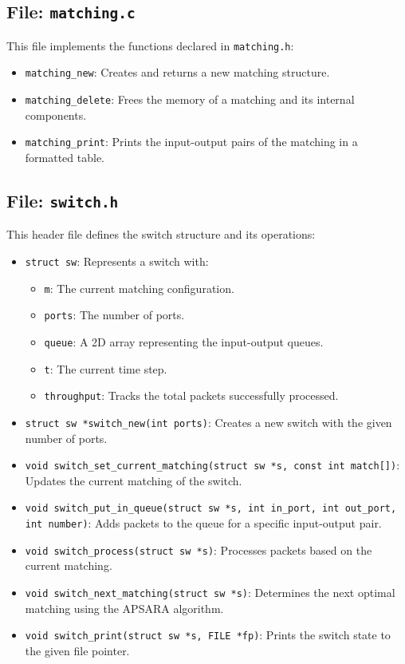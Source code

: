 \documentclass[12pt	]{article}
\begin{document}
\subsection{File: \texttt{matching.c}}
This file implements the functions declared in \texttt{matching.h}:
\begin{itemize}
	\item \texttt{matching\_new}: Creates and returns a new matching structure.
	\item \texttt{matching\_delete}: Frees the memory of a matching and its internal components.
	\item \texttt{matching\_print}: Prints the input-output pairs of the matching in a formatted table.
\end{itemize}

\subsection{File: \texttt{switch.h}}
This header file defines the switch structure and its operations:
\begin{itemize}
	\item \texttt{struct sw}: Represents a switch with:
	\begin{itemize}
		\item \texttt{m}: The current matching configuration.
		\item \texttt{ports}: The number of ports.
		\item \texttt{queue}: A 2D array representing the input-output queues.
		\item \texttt{t}: The current time step.
		\item \texttt{throughput}: Tracks the total packets successfully processed.
	\end{itemize}
	\item \texttt{struct sw *switch\_new(int ports)}: Creates a new switch with the given number of ports.
	\item \texttt{void switch\_set\_current\_matching(struct sw *s, const int match[])}: Updates the current matching of the switch.
	\item \texttt{void switch\_put\_in\_queue(struct sw *s, int in\_port, int out\_port, int number)}: Adds packets to the queue for a specific input-output pair.
	\item \texttt{void switch\_process(struct sw *s)}: Processes packets based on the current matching.
	\item \texttt{void switch\_next\_matching(struct sw *s)}: Determines the next optimal matching using the APSARA algorithm.
	\item \texttt{void switch\_print(struct sw *s, FILE *fp)}: Prints the switch state to the given file pointer.
\end{itemize}
\end{document}
